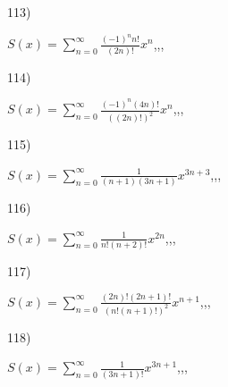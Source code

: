 \documentclass[11pt, ukrainian]{article}
\begin{document}
\par
\newpage
113) \space 
{%
{$S(x)=\sum\limits_{n=0}^{\infty}{\frac{{(-1)^n}{n!}}{(2n)!}}{x^{{n}}}$},,, \par \smallskip  
}
\par
\vspace{0.9cm}
114) \space 
{%
{$S(x)=\sum\limits_{n=0}^{\infty}{\frac{{(-1)^n}(4n)!}{{((2n)!)^2}}}{x^{{n}}}$},,, \par \smallskip  
}
\par
\vspace{0.9cm}
115) \space 
{%
{$S(x)=\sum\limits_{n=0}^{\infty}{\frac{1}{(n+1)(3n+1)}}{x^{{3n+3}}}$},,, \par \smallskip  
}
\par
\vspace{0.9cm}
116) \space 
{%
{$S(x)=\sum\limits_{n=0}^{\infty}{\frac{1}{n!(n+2)!}}{x^{{2n}}}$},,, \par \smallskip  
}
\par
\vspace{0.9cm}
117) \space 
{%
{$S(x)=\sum\limits_{n=0}^{\infty}{\frac{(2n)!(2n+1)!}{(n!(n+1)!)^2}}{x^{{n+1}}}$},,, \par \smallskip  
}
\par
\vspace{0.9cm}
118) \space 
{%
{$S(x)=\sum\limits_{n=0}^{\infty}{\frac{1}{(3n+1)!}}{x^{{3n+1}}}$},,, \par \smallskip  
}
\end{document}
